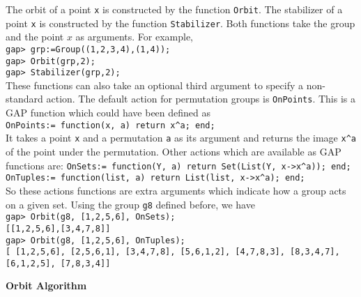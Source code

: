\documentclass[12pt]{amsart}
\theoremstyle{definition}
\begin{document}
The orbit of a point \verb"x" is constructed by the function \verb"Orbit".  The stabilizer of a point \verb"x" is constructed by the function \verb"Stabilizer".  Both functions take the group and the point $x$ as arguments.  For example,\\
\verb"gap> grp:=Group((1,2,3,4),(1,4));"\\
\verb"gap> Orbit(grp,2);"\\
\verb"gap> Stabilizer(grp,2);"\\
These functions can also take an optional third argument to specify a non-standard  action.  The default action for permutation groups is \verb"OnPoints".  This is a GAP function which could have been defined as\\
\verb"OnPoints:= function(x, a) return x^a; end;"\\
It takes a point \verb"x" and a permutation \verb"a" as its argument and returns the image \verb"x^a" of the point under the permutation.  Other actions which are available as GAP functions are:
\verb"OnSets:= function(Y, a) return Set(List(Y, x->x^a)); end;"\\
\verb"OnTuples:= function(list, a) return List(list, x->x^a); end;"\\
So these actions functions are extra arguments which indicate how a group acts on a given set.  Using the group \verb"g8" defined before, we have\\
\verb"gap> Orbit(g8, [1,2,5,6], OnSets);"\\
\verb"[[1,2,5,6],[3,4,7,8]]"\\
\verb"gap> Orbit(g8, [1,2,5,6], OnTuples);"\\
\verb"[ [1,2,5,6], [2,5,6,1], [3,4,7,8], [5,6,1,2], [4,7,8,3], [8,3,4,7],"\\
\verb"[6,1,2,5], [7,8,3,4]]"

\begin{center}
\textbf{Orbit Algorithm}
\end{center}
\end{document}

